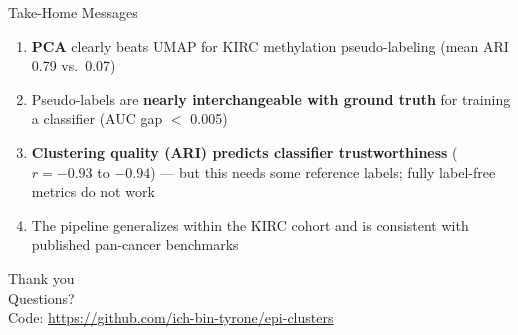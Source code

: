 \documentclass[aspectratio=169]{beamer}
\begin{document}
\begin{frame}{Take-Home Messages}
  \begin{enumerate}
    \item \textbf{PCA} clearly beats UMAP for KIRC methylation pseudo-labeling (mean ARI 0.79 vs.\ 0.07)
    \item Pseudo-labels are \textbf{nearly interchangeable with ground truth} for training a classifier (AUC gap $<$ 0.005)
    \item \textbf{Clustering quality (ARI) predicts classifier trustworthiness} ($r=-0.93$ to $-0.94$) --- but this needs some reference labels; fully label-free metrics do not work
    \item The pipeline generalizes within the KIRC cohort and is consistent with published pan-cancer benchmarks
  \end{enumerate}
\end{frame}

\begin{frame}
  \centering
  \Large Thank you \\[0.3cm]
  \normalsize Questions? \\[0.5cm]
  {\small Code: \url{https://github.com/ich-bin-tyrone/epi-clusters}}
\end{frame}
\end{document}
